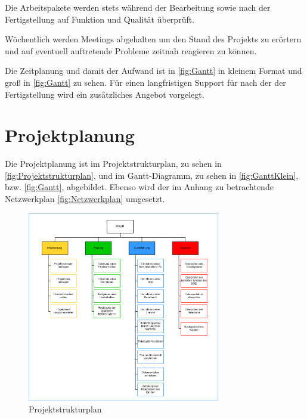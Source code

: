 \documentclass[a4paper,
    11pt,
    headings=small,
    ngerman,
    listof=totoc,
    numbers=noenddot]{scrreprt}[2021/11/13]
\begin{document}
Die Arbeitspakete werden stets während der Bearbeitung sowie nach der Fertigstellung auf Funktion und Qualität überprüft.

Wöchentlich werden Meetings abgehalten um den Stand des Projekts zu erörtern und auf eventuell auftretende Probleme zeitnah reagieren zu können.

Die Zeitplanung und damit der Aufwand ist in \vref{fig:Gantt} in kleinem Format und groß in \vref{fig:Gantt} zu sehen.  Für einen langfristigen Support für nach der der Fertigstellung wird ein zusätzliches Angebot vorgelegt.


\section{Projektplanung}

Die Projektplanung ist im Projektstrukturplan, zu sehen in \vref{fig:Projektstrukturplan}, und im Gantt-Diagramm, zu sehen in \vref{fig:GanttKlein}, bzw. \vref{fig:Gantt}, abgebildet.
Ebenso wird der im Anhang  zu betrachtende Netzwerkplan \vref{fig:Netzwerkplan} umgesetzt.

\begin{figure}[htbp]
  \centering
  \includegraphics[width=0.75\textwidth]{data/Projektstrukturplan.png}
  \caption{Projektstrukturplan}
  \label{fig:Projektstrukturplan}
\end{figure}
\end{document}
